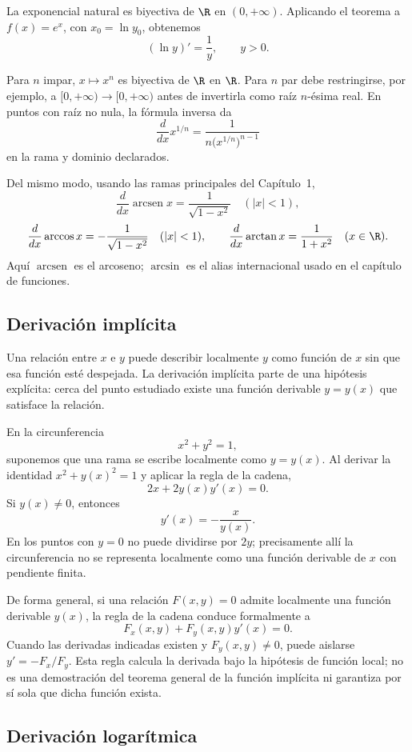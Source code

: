 La exponencial natural es biyectiva de \(\R\) en \((0,+\infty)\). Aplicando el
teorema a \(f(x)=e^x\), con \(x_0=\ln y_0\), obtenemos
\[
  (\ln y)'=\frac1y, \qquad y>0.
\]

Para \(n\) impar, \(x\mapsto x^n\) es biyectiva de \(\R\) en \(\R\). Para
\(n\) par debe restringirse, por ejemplo, a
\([0,+\infty)\to[0,+\infty)\) antes de invertirla como raíz \(n\)-ésima
real. En puntos con raíz no nula, la fórmula inversa da
\[
  \frac{d}{dx}x^{1/n}
  =\frac{1}{n\bigl(x^{1/n}\bigr)^{n-1}}
\]
en la rama y dominio declarados.

Del mismo modo, usando las ramas principales del Capítulo~1,
\[
 \frac{d}{dx}\operatorname{arcsen}x=\frac1{\sqrt{1-x^2}}
 \quad(|x|<1),
\]
\[
 \frac{d}{dx}\arccos x=-\frac1{\sqrt{1-x^2}}
 \quad(|x|<1),
 \qquad
 \frac{d}{dx}\arctan x=\frac1{1+x^2}
 \quad(x\in\R).
\]
Aquí \(\operatorname{arcsen}\) es el arcoseno; \(\arcsin\) es el alias
internacional usado en el capítulo de funciones.

\subsection{Derivación implícita}

Una relación entre \(x\) e \(y\) puede describir localmente \(y\) como función
de \(x\) sin que esa función esté despejada. La derivación implícita parte de
una hipótesis explícita: cerca del punto estudiado existe una función derivable
\(y=y(x)\) que satisface la relación.

En la circunferencia
\[
  x^2+y^2=1,
\]
suponemos que una rama se escribe localmente como \(y=y(x)\). Al derivar la
identidad \(x^2+y(x)^2=1\) y aplicar la regla de la cadena,
\[
  2x+2y(x)y'(x)=0.
\]
Si \(y(x)\ne0\), entonces
\[
  y'(x)=-\frac{x}{y(x)}.
\]
En los puntos con \(y=0\) no puede dividirse por \(2y\); precisamente allí la
circunferencia no se representa localmente como una función derivable de
\(x\) con pendiente finita.

De forma general, si una relación \(F(x,y)=0\) admite localmente una función
derivable \(y(x)\), la regla de la cadena conduce formalmente a
\[
  F_x(x,y)+F_y(x,y)y'(x)=0.
\]
Cuando las derivadas indicadas existen y \(F_y(x,y)\ne0\), puede aislarse
\(y'=-F_x/F_y\). Esta regla calcula la derivada bajo la hipótesis de función
local; no es una demostración del teorema general de la función implícita ni
garantiza por sí sola que dicha función exista.

\subsection{Derivación logarítmica}

